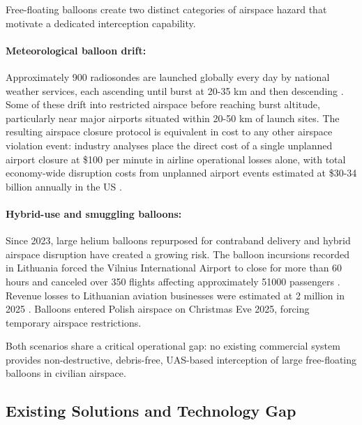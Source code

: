 Free-floating balloons create two distinct categories of airspace hazard that
motivate a dedicated interception capability.
 \vspace{-10pt}
\paragraph{Meteorological balloon drift:}
Approximately 900 radiosondes are launched globally every day by national weather services, each ascending until burst at 20-35 km and then descending \cite{WorldMeteorologicalOrganization2018GuideGuide}. Some of these drift into restricted airspace before reaching burst altitude, particularly near major airports situated within 20-50 km of launch sites. The resulting airspace closure protocol is equivalent in cost to any other airspace violation event: industry analyses place the direct cost of a single unplanned airport closure at \$100 per minute in airline operational losses alone, with total economy-wide
disruption costs from unplanned airport events estimated at \$30-34 billion annually in the US \cite{AirHelp2024CostEconomy, AirHelp20242023Overview}. 
 \vspace{-10pt}
\paragraph{Hybrid-use and smuggling balloons:}
Since 2023, large helium balloons repurposed for contraband delivery and hybrid airspace disruption have created a growing risk. The balloon incursions recorded in Lithuania forced the Vilnius International Airport to close for more than 60 hours and canceled over
350 flights affecting approximately 51000 passengers \cite{AlJazeera2025LithuaniaBelarus}. Revenue losses to Lithuanian aviation businesses were estimated at \texteuro{}2 million in 2025 \cite{BBCNews2025BalloonClosures}. Balloons entered Polish airspace on Christmas Eve 2025, forcing temporary airspace restrictions\cite{EuromaidanPress2025PolandEve}.
 
Both scenarios share a critical operational gap: no existing commercial system provides non-destructive, debris-free, UAS-based interception of large free-floating balloons in civilian airspace.
 
 \vspace{-10pt}
\subsection*{Existing Solutions and Technology Gap}
\label{subsec:solutions}
 
